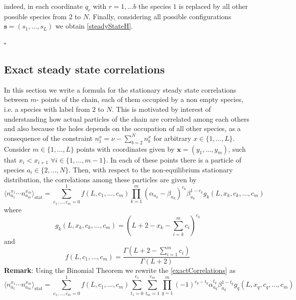 \documentclass[11pt]{article}
\numberwithin{equation}{section}
\numberwithin{equation}{subsection}
\begin{document}
indeed, in each coordinate $q_{r}$ with $r=1,\ldots b$ the species $1$ is replaced by all other possible species from $2$ to $N$.  Finally, considering all possible configurations $\bm{s}=(s_{1},\ldots,s_{L})$ we obtain \eqref{steadyStateH}. 
\begin{flushright}
    $\square$
\end{flushright}
\subsection{Exact steady state correlations}\label{correlation-section}
In this section we write a formula for the stationary steady state correlations between $m$- points of the chain, each of them occupied by a non empty species, i.e. a species with label from $2$ to $N$. This is motivated by interest of understanding how actual particles of the chain are correlated among each others and also because the holes depends on the occupation of all other species, as a consequence of the constraint $n_{1}^{x}=\nu-\sum_{b=2}^{N}n_{b}^{x}$ for arbitrary $x\in \{1,\ldots,L\}$. Consider $m\in \{1,\ldots,L\}$ points with coordinates given by $\bm{x}=(y_{1},\ldots,y_{m})$, such that $x_{i}<x_{i+1}$ $\forall i\in \{1,\ldots,m-1\}$. In each of these points there is a particle of species $a_{i}\in \{2,\ldots,N\}$. Then, with respect to the non-equilibrium stationary distribution, the correlations among these particles are given by
\begin{equation}\label{exactCorrelations}
		\langle n^{x_{1}}_{a_{1}}\cdots n^{x_{m}}_{a_{m}}\rangle_{\text{stat}}=\sum_{c_{1},\ldots,c_{m}=0}^{1}
			f(L,c_{1},\ldots,c_{m})\prod_{k=1}^{m}(\alpha_{a_{k}}-\beta_{a_{k}})^{c_{k}}\beta_{a_{k}}^{1-c_{k}}g_{k}(L,x_{k},c_{k},\ldots,c_{m})
	\end{equation}
	where 
	\begin{equation}\label{powerCoeffSpecies}
		g_{k}(L,x_{k},c_{k},\ldots,c_{m})=\left(L+2-x_{k}-\sum_{i=k}^{m}c_{i}\right)^{c_{k}}
	\end{equation}
	and 
	\begin{equation}\label{powerCoeffNOspec}
		f(L,c_{1},\ldots,c_{m})=\frac{\Gamma(L+2-\sum_{i=1}^{m}c_{i})}{\Gamma(L+2)}
	\end{equation}
\textbf{Remark}: Using the Binomial Theorem we rewrite the \eqref{exactCorrelations} as 
\begin{equation}
\langle n^{x_{1}}_{a_{1}}\cdots n^{x_{m}}_{a_{m}}\rangle_{\text{stat}}=\sum_{c_{1},\ldots,c_{m}=0}^{1}
f(L,c_{1},\ldots,c_{m})\sum_{t_{1}=0}^{c_{1}}\sum_{t_{m}=1}^{c_{m}}\prod_{q=1}^{m}(-1)^{c_{q}-t_{q}}\alpha_{a_{q}}^{t_{q}}\beta_{a_{q}}^{1-t_{q}}g_{q}(L,x_{q},c_{q},\ldots,c_{m})
\end{equation}
\end{document}
